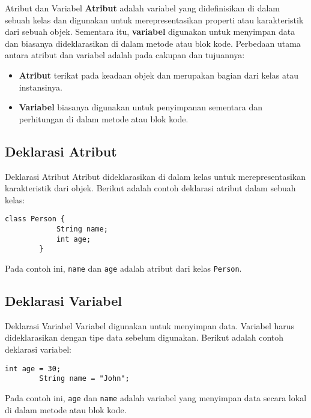 \documentclass[aspectratio=169, table]{beamer}
\begin{document}
\begin{frame}{Atribut dan Variabel}
	\textbf{Atribut} adalah variabel yang didefinisikan di dalam sebuah kelas dan digunakan untuk merepresentasikan properti atau karakteristik dari sebuah objek. Sementara itu, \textbf{variabel} digunakan untuk menyimpan data dan biasanya dideklarasikan di dalam metode atau blok kode. Perbedaan utama antara atribut dan variabel adalah pada cakupan dan tujuannya:
	\begin{itemize}
		\item \textbf{Atribut} terikat pada keadaan objek dan merupakan bagian dari kelas atau instansinya.
		\item \textbf{Variabel} biasanya digunakan untuk penyimpanan sementara dan perhitungan di dalam metode atau blok kode.
	\end{itemize}
\end{frame}

\subsection{Deklarasi Atribut}
\begin{frame}[fragile]{Deklarasi Atribut}
	Atribut dideklarasikan di dalam kelas untuk merepresentasikan karakteristik dari objek. Berikut adalah contoh deklarasi atribut dalam sebuah kelas:
	
	\begin{lstlisting}[style=JavaStyle]
		class Person {
			String name;
			int age;
		}
	\end{lstlisting}
	Pada contoh ini, \texttt{name} dan \texttt{age} adalah atribut dari kelas \texttt{Person}.
\end{frame}

\subsection{Deklarasi Variabel}
\begin{frame}[fragile]{Deklarasi Variabel}
	Variabel digunakan untuk menyimpan data. Variabel harus dideklarasikan dengan tipe data sebelum digunakan. Berikut adalah contoh deklarasi variabel:
	
	\begin{lstlisting}[style=JavaStyle]
		int age = 30;
		String name = "John";
	\end{lstlisting}
	Pada contoh ini, \texttt{age} dan \texttt{name} adalah variabel yang menyimpan data secara lokal di dalam metode atau blok kode.
\end{frame}
\end{document}
